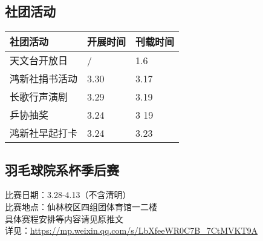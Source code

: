 \documentclass[letterpaper, 12pt]{article}
\begin{document}
\begin{multicols}{2}
\section{社团活动}
\begin{tabular}{|>{\centering\arraybackslash}m{}|m{}|m{}|}
    \hline
    社团活动 & 开展时间 & 刊载时间\\
    \hline\hline
    天文台开放日 & / & 1.6\\
    鸿新社捐书活动 & 3.30 & 3.17\\
    长歌行声演剧 & 3.29 & 3.19\\
    乒协抽奖 & 3.24 & 3 19\\
    鸿新社早起打卡 & 3.24 & 3.23\\
    \hline
\end{tabular}
\end{multicols}

\subsection{羽毛球院系杯季后赛}
比赛日期：3.28-4.13（不含清明）
\\比赛地点：仙林校区四组团体育馆一二楼
\\具体赛程安排等内容请见原推文
\\详见：\url{https://mp.weixin.qq.com/s/LbXfeeWR0C7B_7CtMVKT9A}
\end{document}
